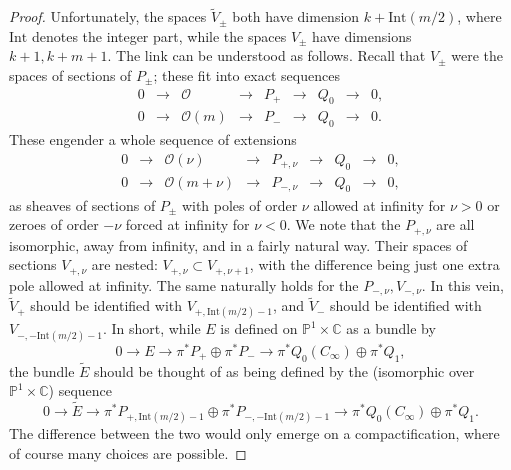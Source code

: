 \documentclass[12pt]{article}
\theoremstyle{definition}
\theoremstyle{remark}
\numberwithin{theorem}{section}
\def\bC{{\mathbb {C}}}
\def\bP{{\mathbb {P}}}
\def\pO{{\mathcal O}}
\begin{document}
\begin{proof}
Unfortunately, the spaces $\widetilde V_\pm$ both have dimension $k+ \mathrm{Int}(m /2)$, where $\mathrm{Int}$ denotes the integer part, while the spaces $  V_\pm$ have dimensions $k+1, k+m+1$. The link can be understood as follows. Recall that $V_\pm$ were the spaces of sections of $P_\pm$; these fit into   exact sequences 
 \begin{equation} 
\begin{matrix}
0&\rightarrow& \pO &\rightarrow& P_+& \rightarrow& Q_0&\rightarrow&0,\\
0&\rightarrow& \pO(m) &\rightarrow& P_-&  \rightarrow& Q_0&\rightarrow&0.  
\end{matrix}
\end{equation}
 These engender a whole sequence of extensions
  \begin{equation} 
\begin{matrix}
0&\rightarrow& \pO(\nu) &\rightarrow& P_{+,\nu}& \rightarrow& Q_0&\rightarrow&0,\\
0&\rightarrow& \pO(m+\nu) &\rightarrow& P_{-,\nu}&  \rightarrow& Q_0&\rightarrow&0, \end{matrix}
\end{equation}
 as sheaves of sections of $ P_{\pm}$ with poles of order $\nu$ allowed at infinity for $\nu>0$ or zeroes of order $-\nu$ forced at infinity for $\nu<0$. We note that the $P_{+,\nu}$ are all isomorphic, away from infinity, and in a fairly natural way.  Their spaces of sections $V_{+, \nu}$ are nested: $V_{+, \nu}\subset  V_{+, \nu+1}$, with the difference being just one extra pole allowed at infinity. The same naturally holds for the $P_{-,\nu}, V_{-, \nu} $. In this vein,  $\widetilde V_+$ should be identified with $V_{+, \mathrm{Int}(m/2)-1}$, and $\widetilde V_-$ should be identified with $V_{-, -\mathrm{Int}(m/2)-1}$. In short, 
 while $E$ is defined on $\bP^1\times \bC$ as a bundle by 
\begin{equation} 
0\rightarrow  E \rightarrow \pi^*P_{+}\oplus \pi^*P_{-} \rightarrow \pi^*Q_{0}(C_\infty) \oplus \pi^*Q_{ 1}, 
\end{equation} 
 the bundle $\widetilde E$ should be thought of as being defined by the (isomorphic over  $\bP^1\times \bC$) sequence
  \begin{equation} 
0\rightarrow \widetilde E \rightarrow \pi^*P_{+, \mathrm{Int}(m/2)-1}\oplus \pi^*P_{-, -\mathrm{Int}(m/2)-1} \rightarrow \pi^*Q_{0}(C_\infty) \oplus \pi^*Q_{ 1}. \end{equation} 
The difference between the two would only emerge on a compactification, where of course many choices are possible.
  

\end{proof}
\end{document}
